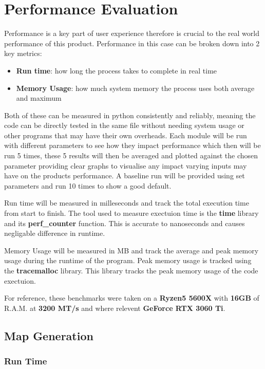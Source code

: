 \documentclass[final]{cmpreport_02}
\begin{document}
\section{Performance Evaluation}

Performance is a key part of user experience therefore is crucial to the real world performance of this product.
Performance in this case can be broken down into 2 key metrics:

\begin{itemize}
	\item{\textbf{Run time}: how long the process takes to complete in real time}
	\item{\textbf{Memory Usage}: how much system memory the process uses both average and maximum}
\end{itemize}

Both of these can be measured in python consistently and reliably, meaning the code can be directly tested in the same file without needing system usage or other programs that may have their own overheads.
Each module will be run with different parameters to see how they impact performance which then will be run 5 times,
these 5 results will then be averaged and plotted against the chosen parameter providing clear graphs to visualise any impact varying inputs may have on the products performance.
A baseline run will be provided using set parameters and run 10 times to show a good default.

Run time will be measured in milleseconds and track the total execution time from start to finish.
The tool used to measure exectuion time  is the \textbf{time} library and its \textbf{perf\_counter} function.
This is accurate to nanoseconds and causes negligable difference in runtime.

Memory Usage will be measured in MB and track the average and peak memory usage during the runtime of the program.
Peak memory usage is tracked using the \textbf{tracemalloc} library.
This library tracks the peak memory usage of the code exectuion.

For reference, these benchmarks were taken on a \textbf{Ryzen5 5600X} with \textbf{16GB} of R.A.M. at \textbf{3200 MT/s} and where relevent \textbf{GeForce RTX 3060 Ti}.

\subsection{Map Generation}
\subsubsection{Run Time}
\end{document}
